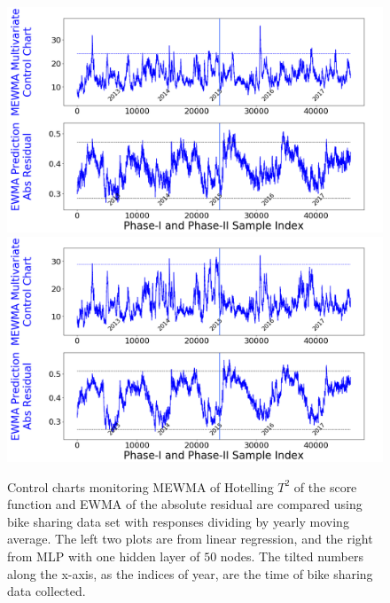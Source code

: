 \documentclass[twoside,11pt]{article}
\begin{document}
\begin{figure}[!htbp]
\centering
\includegraphics[width = 0.49\linewidth]{../figures/v14/bike_sharing/reg_norm_scal_train/bike_reg_1e-08_0_0001_0_005_99_0.png}
\includegraphics[width = 0.49\linewidth]{../figures/v14/bike_sharing/reg_norm_nnet_scal_train/bike_reg_0_1_0_0001_0_005_99_0.png}
  \caption{
Control charts monitoring MEWMA of Hotelling $T^2$ of the score function and EWMA of the absolute residual are compared using bike sharing data set with responses dividing by yearly moving average. The left two plots are from linear regression, and the right from MLP with one hidden layer of $50$ nodes. The tilted numbers along the x-axis, as the indices of year, are the time of bike sharing data collected.
}
\label{fig:bike_sharing_preproc}
\end{figure}
\end{document}
